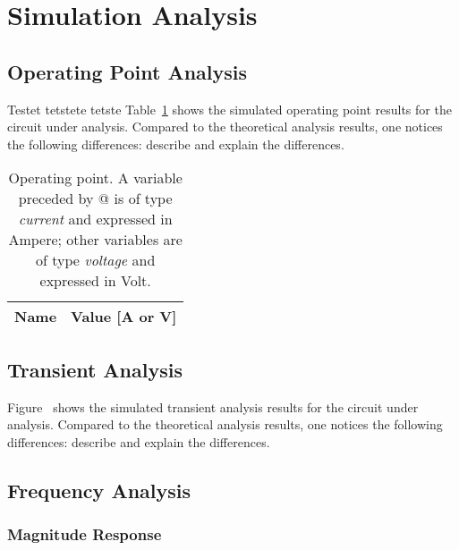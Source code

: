 \section{Simulation Analysis}
\label{sec:simulation}

\subsection{Operating Point Analysis}

Testet tetstete tetste Table~\ref{tab:op} shows the simulated operating point results for the circuit under analysis. Compared to the theoretical analysis results, one notices the following differences: describe and explain the differences.

\begin{table}[H]
  \centering
  \begin{tabular}{|l|r|}
    \hline    
    {\bf Name} & {\bf Value [A or V]} \\ \hline
    
  \end{tabular}
  \caption{Operating point. A variable preceded by @ is of type {\em current} and expressed in Ampere; other variables are of type {\it voltage} and expressed in Volt.}
  \label{tab:op}
\end{table}


\subsection{Transient Analysis}

Figure~ %
shows the simulated transient analysis results for the circuit under analysis. Compared to the theoretical analysis results, one notices the following differences: describe and explain the differences.



\subsection{Frequency Analysis}

\subsubsection{Magnitude Response}

